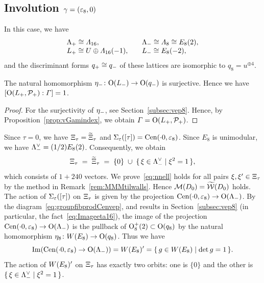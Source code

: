 \documentclass{amsart} %
\begin{document}
\subsection{Involution $\gamma=(\varepsilon_8, 0)$}\label{subsec:walls8}
%
In this case, we have
\[
\begin{array}{ll}
\Lambda_{+}\cong \varLambda_{16}, \quad &\Lambda_{-}\cong \varLambda_{8}\cong E_8(2),\\
L_{+}\cong U\oplus \varLambda_{16}(-1), \quad &L_{-}\cong E_8(-2),
\end{array}
\]
%
and the discriminant forms $q_{+}\cong q_{-}$ of these lattices are 
isomorphic to $q_8=u^{\oplus 4}$.
%
\begin{proposition}\label{prop:indexvep8}
The natural homomorphism ${\eta}_{-}\colon \mathord{\mathrm{O}}(L_{-})\to \mathord{\mathrm{O}}(q_{-})$ is surjective.
Hence we have $[\mathord{\mathrm{O}}(L_{+}, \mathord{\mathcal{P}}_{+}): \varGamma]=1$.
\end{proposition}
%
\begin{proof}
For the surjectivity of ${\eta}_{-}$, see Section~\ref{subsec:vep8}.
Hence, by Proposition~\ref{prop:vGamindex}, we obtain $\varGamma=\mathord{\mathrm{O}}(L_{+}, \mathord{\mathcal{P}}_{+})$.
\end{proof}
%
Since $\tau=0$,
we have $\Xi_{\tau}=\widetilde{\Xi}_{\tau} $ and $\Sigma_{\varepsilon}([\tau])=\mathrm{Cen}(\cdot 0, \varepsilon_{8})$.
Since $E_8$ is unimodular, we have $\Lambda_{-}^{\vee}=(1/2)E_8(2)$.
Consequently, we obtain 
\[
\Xi_{\tau}\;=\;\widetilde{\Xi}_{\tau} \; =\; \{0\}\;\cup\;\{\,{\xi\in \Lambda_{-}^{\vee}}\mid {\xi^2=1} \,\},
\]
which consists of $1+240$ vectors.
We prove~\eqref{eq:nnell} holds for all pairs $\xi, \xi^{\prime}\in \Xi_{\tau}$
by the method in Remark~\ref{rem:MMMtilwalls}.
Hence 
$\mathord{\mathcal{M}}(D_0)=\widetilde{\mathord{\mathcal{W}}}(D_0)$ holds.
%
%
%
The action of $\Sigma_{\varepsilon}([\tau])$ on $\Xi_{\tau}$
is given by the projection 
$\mathrm{Cen}(\cdot 0, \varepsilon_{8})\to \mathord{\mathrm{O}}(\Lambda_{-})$.
By the diagram~\eqref{eq:groupfibprodCenvep}, and results in Section~\ref{subsec:vep8}
(in particular, the fact~\eqref{eq:Imageeta16}), 
the image of the projection $\mathrm{Cen}(\cdot 0, \varepsilon_{8})\to \mathord{\mathrm{O}}(\Lambda_{-})$ is 
the pullback of $\mathord{\mathrm{O}}^{+}_8(2)\subset \mathord{\mathrm{O}}(q_8)$ by the natural homomorphism 
$\eta_8\colon W(E_8)\to \mathord{\mathrm{O}}(q_8)$.
Thus we have 
\[
\operatorname{Im}(\mathrm{Cen}(\cdot 0, \varepsilon_{8})\to \mathord{\mathrm{O}}(\Lambda_{-}) )=W(E_8)^{\prime}=\{\,{g\in W(E_8)}\mid {\det g=1} \,\}.
\]
The action of $W(E_8)^{\prime}$ on $\Xi_{\tau}$ has exactly two orbits:
one is 
$\{0\}$ and the other is $\{\,{\xi\in \Lambda_{-}^{\vee}}\mid {\xi^2=1} \,\}$.
\end{document}
